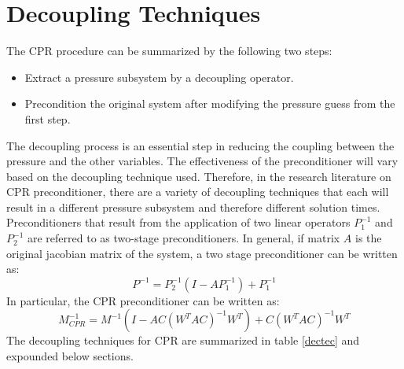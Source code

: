 \section{Decoupling Techniques}
The CPR procedure can be summarized by the following two steps:
\begin{itemize}
	\item Extract a pressure subsystem by a decoupling operator.
	\item Precondition the original system after modifying the pressure guess from the first step.
\end{itemize}
The decoupling process is an essential step in reducing the coupling between the pressure and the other variables.
The effectiveness of the preconditioner will vary based on the decoupling technique used. Therefore, in the research
literature on CPR preconditioner, there are a variety of decoupling techniques that each will result in a different pressure
subsystem and therefore different solution times. Preconditioners that result from the application of two linear operators
$P_{1}^{-1}$ and $P_{2}^{-1}$ are referred to as two-stage preconditioners. In general, if matrix $A$ is the original jacobian
matrix of the system, a two stage preconditioner can be written as:
\begin{equation}
	P^{-1} = P_{2}^{-1}(I-AP_{1}^{-1}) + P_{1}^{-1}
\end{equation}
In particular, the CPR preconditioner can be written as:
\begin{equation}
	M_{CPR}^{-1} = M^{-1}(I - AC(W^{T}AC)^{-1}W^{T}) + C(W^{T}AC)^{-1}W^{T}
\end{equation}
The decoupling techniques for CPR are summarized in table \ref{dectec} and expounded below sections.

